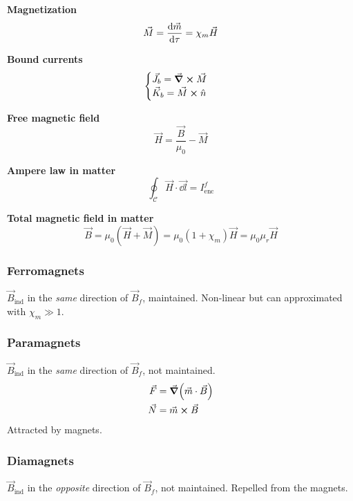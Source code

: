 \documentclass[10pt]{extarticle}
\numberwithin{equation}{section}
\begin{document}
\begin{multicols}{2}
	\textbf{Magnetization}
	\begin{equation}
		\vec M = \dv{\vec m}{\tau} = \chi_m \vec H
	\end{equation}

	\textbf{Bound currents}
	\begin{equation}
		\begin{cases}
			\vec J_b = \curl \vec M \\
			\vec K_b = \vec M \cross \hat n
		\end{cases}
	\end{equation}

	\textbf{Free magnetic field}
	\begin{equation}
		\vec H = \frac{\vec B}{\mu_0} - \vec M
	\end{equation}

	\textbf{Ampere law in matter}
	\begin{equation}
		\oint_\mathcal{C} \vec H \cdot \vec{\dd l } = I^f_{\text{enc}}
	\end{equation}

	\textbf{Total magnetic field in matter}
	\begin{equation}
		\vec B = \mu_0(\vec H + \vec M) = \mu_0 (1 + \chi_m) \vec H = \mu_0 \mu_r \vec H
	\end{equation}

	\subsubsection{Ferromagnets}
	$\vec B_\text{ind}$ in the \emph{same} direction of $\vec B_f$, maintained.
	Non-linear but can approximated with $\chi_m \gg 1$.

	\subsubsection{Paramagnets}
	$\vec B_\text{ind}$ in the \emph{same} direction of $\vec B_f$, not maintained.
	\begin{align}
		\vec F & = \grad(\vec m \cdot \vec B) \\
		\vec N & = \vec m \cross \vec B
	\end{align}
	Attracted by magnets.

	\subsubsection{Diamagnets}
	$\vec B_\text{ind}$ in the \emph{opposite} direction of $\vec B_f$, not maintained.
	Repelled from the magnets.
\end{multicols}
\end{document}
